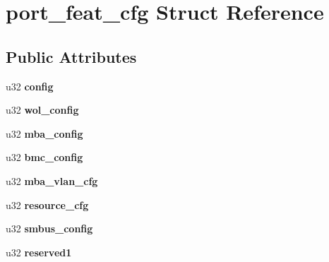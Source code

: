 \hypertarget{structport__feat__cfg}{
\section{port\_\-feat\_\-cfg Struct Reference}
\label{structport__feat__cfg}
}
\subsection*{Public Attributes}
\begin{DoxyCompactItemize}
\item 
\hypertarget{structport__feat__cfg_ad10186931de98cdc16ec0a45451981f4}{
u32 {\bfseries config}}
\label{structport__feat__cfg_ad10186931de98cdc16ec0a45451981f4}

\item 
\hypertarget{structport__feat__cfg_a02be2da9c38db0586964b75de5d0e9c0}{
u32 {\bfseries wol\_\-config}}
\label{structport__feat__cfg_a02be2da9c38db0586964b75de5d0e9c0}

\item 
\hypertarget{structport__feat__cfg_a25e5c1e96e0bd8eda3d59d895fc519d2}{
u32 {\bfseries mba\_\-config}}
\label{structport__feat__cfg_a25e5c1e96e0bd8eda3d59d895fc519d2}

\item 
\hypertarget{structport__feat__cfg_a1d2615d0de01176d6cf147d808318e00}{
u32 {\bfseries bmc\_\-config}}
\label{structport__feat__cfg_a1d2615d0de01176d6cf147d808318e00}

\item 
\hypertarget{structport__feat__cfg_aa921142a4195f33facaefabab529ef12}{
u32 {\bfseries mba\_\-vlan\_\-cfg}}
\label{structport__feat__cfg_aa921142a4195f33facaefabab529ef12}

\item 
\hypertarget{structport__feat__cfg_a1227f9483ec81ae0b22e2f8cd62184a0}{
u32 {\bfseries resource\_\-cfg}}
\label{structport__feat__cfg_a1227f9483ec81ae0b22e2f8cd62184a0}

\item 
\hypertarget{structport__feat__cfg_ac6ad6522881920d03c02e00eb4eefb33}{
u32 {\bfseries smbus\_\-config}}
\label{structport__feat__cfg_ac6ad6522881920d03c02e00eb4eefb33}

\item 
\hypertarget{structport__feat__cfg_abcaf7d4b9d9a61f62ec406249d290007}{
u32 {\bfseries reserved1}}
\label{structport__feat__cfg_abcaf7d4b9d9a61f62ec406249d290007}


\end{DoxyCompactItemize}
